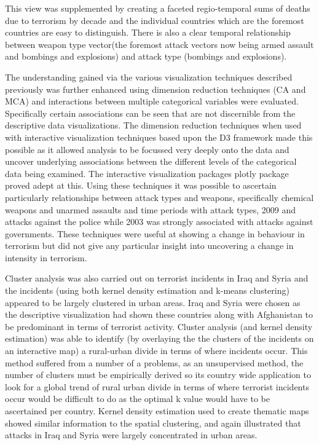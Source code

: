 This view was supplemented by creating a faceted regio-temporal sums of deaths due to terrorism by decade and the individual countries which are the foremost countries are easy to distinguish. There is also a clear temporal relationship between weapon type vector(the foremost attack vectors now being armed assault and bombings and explosions) and attack type (bombings and explosions). 

The understanding gained via the various visualization techniques described previously was further enhanced using dimension reduction techniques (CA and MCA) and interactions between multiple categorical variables were evaluated. Specifically certain associations can be seen that are not discernible from the descriptive data visualizations. The dimension reduction techniques when used with interactive visualization techniques based upon the D3 framework made this possible as it allowed analysis to be focussed very deeply onto the data and uncover underlying associations between the different levels of the categorical data being examined. The interactive visualization packages plotly package proved adept at this. Using these techniques it was possible to ascertain particularly relationships between attack types and weapons, specifically chemical weapons and unarmed assaults and time periods with attack types, 2009 and attacks against the police while 2003 was strongly associated with attacks against governments. These techniques were useful at showing a change in behaviour in terrorism but did not give any particular insight into uncovering a change in intensity in terrorism.

Cluster analysis was also carried out on terrorist incidents in Iraq and Syria and the incidents (using both kernel density estimation and k-means clustering) appeared to be largely clustered in urban areas. Iraq and Syria were chosen as the descriptive visualization had shown these countries along with Afghanistan to be predominant in terms of terrorist activity. Cluster analysis (and kernel density estimation) was able to identify (by overlaying the the clusters of the incidents on an interactive map) a rural-urban divide in terms of where incidents occur. This method suffered from a number of a problems, as an unsupervised method, the number of clusters must be empirically derived so its country wide application to look for a global trend of rural urban divide in terms of where terrorist incidents occur would be difficult to do as the optimal k value would have to be ascertained per country. Kernel density estimation used to create thematic maps showed similar information to the spatial clustering, and again illustrated that attacks in Iraq and Syria were largely concentrated in urban areas.

